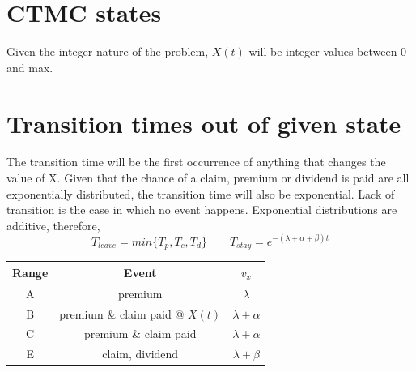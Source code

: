 \documentclass[]{article}
\author{Braden Fineberg}
\begin{document}
	

 

\section{CTMC states}
Given the integer nature of the problem, $X(t)$ will be integer values between 0 and max.

\section{Transition times out of given state}
The transition time will be the first occurrence of anything that changes the value of X. Given that the chance of a claim, premium or dividend is paid are all exponentially distributed, the transition time will also be exponential. Lack of transition is the case in which no event happens. Exponential distributions are additive, therefore, $$T_{leave} = min\{T_p, T_c, T_d\} \qquad T_{stay} = e^{-(\lambda + \alpha + \beta)t}$$
\begin{center}
	\begin{tabular}{|| c | c | c||} 
		\hline
		Range & Event & $v_x$ \\ [0.5ex] 
		\hline\hline
		A & premium & $\lambda$ \\ 
		\hline
		B & premium \& claim paid @ $X(t)$& $\lambda + \alpha$ \\
		\hline
		C & premium \& claim paid & $\lambda + \alpha$ \\
		\hline
		E & claim, dividend & $\lambda + \beta$ \\ [.5ex] 
		\hline
	\end{tabular}
\end{center}
\end{document}
